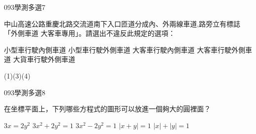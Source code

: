 \begin{QUESTIONS}
    \begin{QUESTION}
        \begin{ExamInfo}{093}{學測}{多選}{7}
        \end{ExamInfo}
        \begin{ExamAnsRateInfo}{56}{77}{61}{30}
        \end{ExamAnsRateInfo}
        \begin{QBODY}
            中山高速公路重慶北路交流道南下入口匝道分成內、外兩線車道,路旁立有標誌 「外側車道 大客車專用」。請選出不違反此規定的選項：
            \begin{QOPS}
                \QOP 小型車行駛內側車道 
                \QOP 小型車行駛外側車道 
                \QOP 大客車行駛內側車道 
                \QOP 大客車行駛外側車道 
                \QOP 大貨車行駛外側車道
            \end{QOPS}
        \end{QBODY}
        \begin{QFROMS}
        \end{QFROMS}
        \begin{QTAGS}\end{QTAGS}
        \begin{QANS}
            (1)(3)(4)
        \end{QANS}
        \begin{QSOLLIST}
        \end{QSOLLIST}
        \begin{QEMPTYSPACE}
        \end{QEMPTYSPACE}
    \end{QUESTION}
    \begin{QUESTION}
        \begin{ExamInfo}{093}{學測}{多選}{8}
        \end{ExamInfo}
        \begin{ExamAnsRateInfo}{43}{77}{39}{13}
        \end{ExamAnsRateInfo}
        \begin{QBODY}
            在坐標平面上，下列哪些方程式的圖形可以放進一個夠大的圓裡面？ 
            \begin{QOPS} 
                \QOP $3x=2y^2$ 
                \QOP $3x^2+2y^2=1$ 
                \QOP $3x^2-2y^2=1$ \QOP $|x+y|=1$ 
                \QOP $|x|+|y|=1$
            \end{QOPS}
        \end{QBODY}
        \begin{QFROMS}

\end{QFROMS}
\end{QUESTION}
\end{QUESTIONS}
